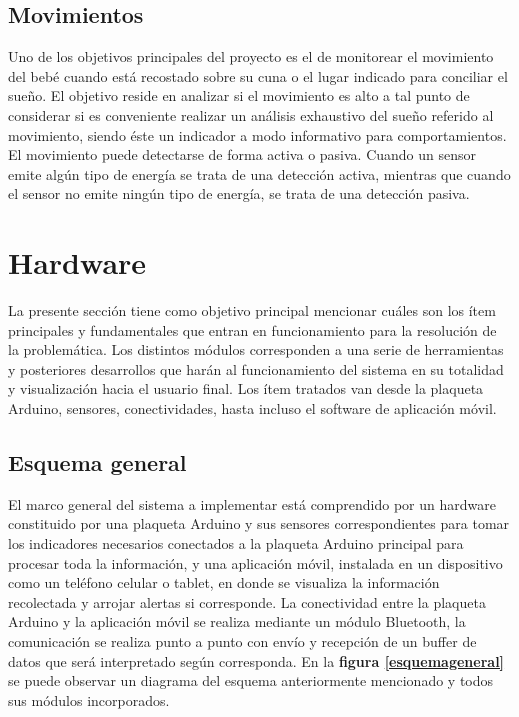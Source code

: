 \documentclass{IEEEtran}
\begin{document}
		\subsection{Movimientos}

			Uno de los objetivos principales del proyecto es el de monitorear el movimiento del bebé cuando está recostado sobre su cuna o el lugar indicado para conciliar el sueño. El objetivo reside en analizar si el movimiento es alto a tal punto de considerar si es conveniente realizar un análisis exhaustivo del sueño referido al movimiento, siendo éste un indicador a modo informativo para comportamientos. El movimiento puede detectarse de forma activa o pasiva. Cuando un sensor emite algún tipo de energía se trata de una detección activa, mientras que cuando el sensor no emite ningún tipo de energía, se trata de una detección pasiva.

	\section{Hardware}

		La presente sección tiene como objetivo principal mencionar cuáles son los ítem principales y fundamentales que entran en funcionamiento para la resolución de la problemática. Los distintos módulos corresponden a una serie de herramientas y posteriores desarrollos que harán al funcionamiento del sistema en su totalidad y visualización hacia el usuario final. Los ítem tratados van desde la plaqueta Arduino, sensores, conectividades, hasta incluso el software de aplicación móvil.

		\subsection{Esquema general}

			El marco general del sistema a implementar está comprendido por un hardware constituido por una plaqueta Arduino y sus sensores correspondientes para tomar los indicadores necesarios conectados a la plaqueta Arduino principal para procesar toda la información, y una aplicación móvil, instalada en un dispositivo como un teléfono celular o tablet, en donde se visualiza la información recolectada y arrojar alertas si corresponde. La conectividad entre la plaqueta Arduino y la aplicación móvil se realiza mediante un módulo Bluetooth, la comunicación se realiza punto a punto con envío y recepción de un buffer de datos que será interpretado según corresponda. En la \textbf{figura \ref{esquemageneral}} se puede observar un diagrama del esquema anteriormente mencionado y todos sus módulos incorporados.
\end{document}
